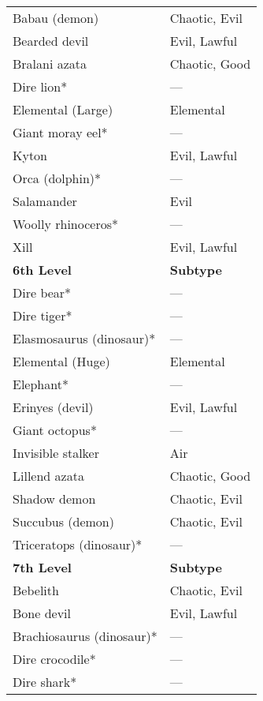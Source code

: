 \begin{tabular}{ll}
Babau (demon)             & Chaotic, Evil    \\
Bearded devil             & Evil, Lawful     \\
Bralani azata             & Chaotic, Good    \\
Dire lion*                & ---                \\
Elemental (Large)         & Elemental        \\
Giant moray eel*          & ---                \\
Kyton                     & Evil, Lawful     \\
Orca (dolphin)*           & ---                \\
Salamander                & Evil             \\
Woolly rhinoceros*        & ---                \\
Xill                      & Evil, Lawful     \\
\textbf{6th Level}        & \textbf{Subtype} \\
Dire bear*                & ---                \\
Dire tiger*               & ---                \\
Elasmosaurus (dinosaur)*  & ---                \\
Elemental (Huge)          & Elemental        \\
Elephant*                 & ---                \\
Erinyes (devil)           & Evil, Lawful     \\
Giant octopus*            & ---                \\
Invisible stalker         & Air              \\
Lillend azata             & Chaotic, Good    \\
Shadow demon              & Chaotic, Evil    \\
Succubus (demon)          & Chaotic, Evil    \\
Triceratops (dinosaur)*   & ---                \\
\textbf{7th Level}        & \textbf{Subtype} \\
Bebelith                  & Chaotic, Evil    \\
Bone devil                & Evil, Lawful     \\
Brachiosaurus (dinosaur)* & ---                \\
Dire crocodile*           & ---                \\
Dire shark*               & ---                \\

\end{tabular}
